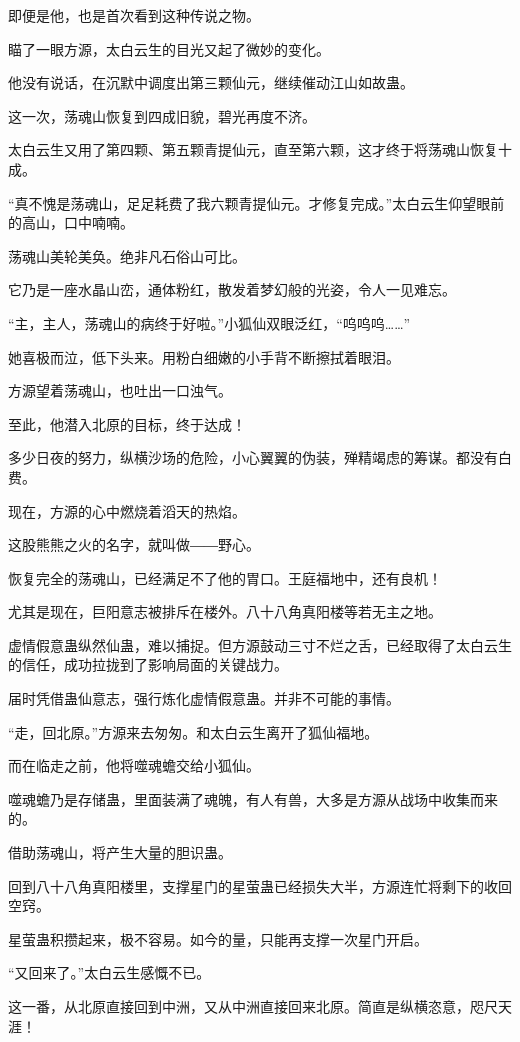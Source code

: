\begin{this_body}
即便是他，也是首次看到这种传说之物。

瞄了一眼方源，太白云生的目光又起了微妙的变化。

他没有说话，在沉默中调度出第三颗仙元，继续催动江山如故蛊。

这一次，荡魂山恢复到四成旧貌，碧光再度不济。

太白云生又用了第四颗、第五颗青提仙元，直至第六颗，这才终于将荡魂山恢复十成。

“真不愧是荡魂山，足足耗费了我六颗青提仙元。才修复完成。”太白云生仰望眼前的高山，口中喃喃。

荡魂山美轮美奂。绝非凡石俗山可比。

它乃是一座水晶山峦，通体粉红，散发着梦幻般的光姿，令人一见难忘。

“主，主人，荡魂山的病终于好啦。”小狐仙双眼泛红，“呜呜呜……”

她喜极而泣，低下头来。用粉白细嫩的小手背不断擦拭着眼泪。

方源望着荡魂山，也吐出一口浊气。

至此，他潜入北原的目标，终于达成！

多少日夜的努力，纵横沙场的危险，小心翼翼的伪装，殚精竭虑的筹谋。都没有白费。

现在，方源的心中燃烧着滔天的热焰。

这股熊熊之火的名字，就叫做――野心。

恢复完全的荡魂山，已经满足不了他的胃口。王庭福地中，还有良机！

尤其是现在，巨阳意志被排斥在楼外。八十八角真阳楼等若无主之地。

虚情假意蛊纵然仙蛊，难以捕捉。但方源鼓动三寸不烂之舌，已经取得了太白云生的信任，成功拉拢到了影响局面的关键战力。

届时凭借蛊仙意志，强行炼化虚情假意蛊。并非不可能的事情。

“走，回北原。”方源来去匆匆。和太白云生离开了狐仙福地。

而在临走之前，他将噬魂蟾交给小狐仙。

噬魂蟾乃是存储蛊，里面装满了魂魄，有人有兽，大多是方源从战场中收集而来的。

借助荡魂山，将产生大量的胆识蛊。

回到八十八角真阳楼里，支撑星门的星萤蛊已经损失大半，方源连忙将剩下的收回空窍。

星萤蛊积攒起来，极不容易。如今的量，只能再支撑一次星门开启。

“又回来了。”太白云生感慨不已。

这一番，从北原直接回到中洲，又从中洲直接回来北原。简直是纵横恣意，咫尺天涯！


\end{this_body}
